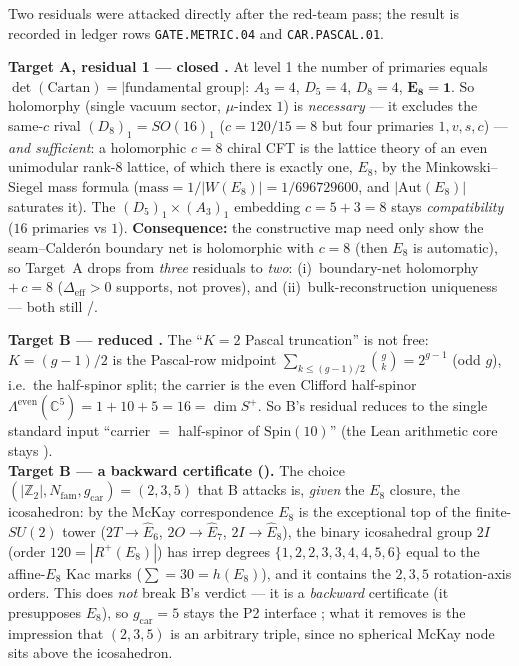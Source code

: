 \documentclass[11pt,a4paper]{article}
\newcommand{\Nfam}{N_{\mathrm{fam}}}
\newcommand{\gcar}{g_{\mathrm{car}}}
\providecommand{\Z}{\mathbb{Z}}
\begin{document}
\begin{winbox}
Two residuals were attacked directly after the red-team pass; the result is recorded in ledger rows
\texttt{GATE.METRIC.04} and \texttt{CAR.PASCAL.01}.

\smallskip\noindent\textbf{Target A, residual 1 --- closed \mE.} At level 1 the number of primaries equals
$\det(\text{Cartan})=|\text{fundamental group}|$: $A_3{=}4$, $D_5{=}4$, $D_8{=}4$, $\mathbf{E_8{=}1}$. So holomorphy
(single vacuum sector, $\mu$-index $1$) is \emph{necessary} --- it excludes the same-$c$ rival $(D_8)_1=SO(16)_1$
($c=120/15=8$ but four primaries $1,v,s,c$) --- \emph{and sufficient}: a holomorphic $c=8$ chiral CFT is the lattice
theory of an even unimodular rank-$8$ lattice, of which there is exactly one, $E_8$, by the Minkowski--Siegel mass
formula ($\text{mass}=1/|W(E_8)|=1/696729600$, and $|\mathrm{Aut}(E_8)|$ saturates it). The
$(D_5)_1\times(A_3)_1$ embedding $c=5+3=8$ stays \emph{compatibility} ($16$ primaries vs $1$). \textbf{Consequence:}
the constructive map need only show the seam--Calder\'on boundary net is holomorphic with $c=8$ (then $E_8$ is
automatic), so Target~A drops from \emph{three} residuals to \emph{two}: (i)~boundary-net holomorphy $+\,c=8$
($\Delta_{\mathrm{eff}}>0$ supports, not proves), and (ii)~bulk-reconstruction uniqueness --- both still \mC/\mO.

\smallskip\noindent\textbf{Target B --- reduced \mE.} The ``$K=2$ Pascal truncation'' is not free:
$K=(g-1)/2$ is the Pascal-row midpoint $\sum_{k\le(g-1)/2}\binom{g}{k}=2^{g-1}$ (odd $g$), i.e.\ the half-spinor
split; the carrier is the even Clifford half-spinor $\Lambda^{\mathrm{even}}(\mathbb C^{5})=1+10+5=16=\dim S^+$. So
B's residual reduces to the single standard input ``carrier $=$ half-spinor of $\mathrm{Spin}(10)$'' (the Lean
arithmetic core stays \mE).
\smallskip\\
\noindent\textbf{Target B --- a backward certificate ().} The choice
$(|\Z_2|,\Nfam,\gcar)=(2,3,5)$ that B attacks is, \emph{given} the $E_8$ closure, the icosahedron: by the
McKay correspondence $E_8$ is the exceptional top of the finite-$SU(2)$ tower ($2T{\to}\hat E_6$,
$2O{\to}\hat E_7$, $2I{\to}\hat E_8$), the binary icosahedral group $2I$ (order $120=|R^+(E_8)|$) has irrep
degrees $\{1,2,2,3,3,4,4,5,6\}$ equal to the affine-$E_8$ Kac marks ($\sum=30=h(E_8)$), and it contains the
$2,3,5$ rotation-axis orders. This does \emph{not} break B's verdict --- it is a \emph{backward} certificate
(it presupposes $E_8$), so $\gcar=5$ stays the P2 interface \mO; what it removes is the impression that
$(2,3,5)$ is an arbitrary triple, since no spherical McKay node sits above the icosahedron.


\end{winbox}
\end{document}
